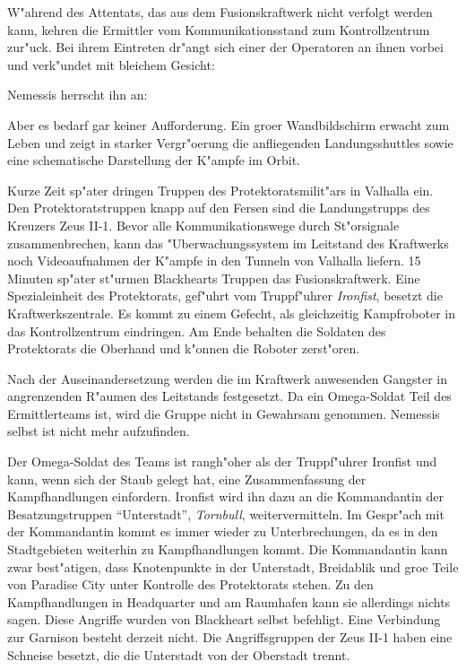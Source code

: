 
W"ahrend des Attentats, das aus dem Fusionskraftwerk nicht verfolgt werden kann, kehren die Ermittler vom Kommunikationsstand zum Kontrollzentrum zur"uck. Bei ihrem Eintreten dr"angt sich einer der Operatoren an ihnen vorbei und verk"undet mit bleichem Gesicht:

 Nemessis herrscht ihn an: 

Aber es bedarf gar keiner Aufforderung. Ein gro\3er Wandbildschirm erwacht zum Leben und zeigt in starker Vergr"o\3erung die anfliegenden Landungsshuttles sowie eine schematische Darstellung der K"ampfe im Orbit.

Kurze Zeit sp"ater dringen Truppen des Protektoratsmilit"ars in Valhalla ein. Den Protektoratstruppen knapp auf den Fersen sind die Landungstrupps des Kreuzers Zeus II-1. Bevor alle Kommunikationswege durch St"orsignale zusammenbrechen, kann das "Uberwachungssystem im Leitstand des Kraftwerks noch Videoaufnahmen der K"ampfe in den Tunneln von Valhalla liefern. 15 Minuten sp"ater st"urmen Blackhearts Truppen das Fusionskraftwerk. Eine Spezialeinheit des Protektorats, gef"uhrt vom Truppf"uhrer \emph{Ironfist}, besetzt die Kraftwerkszentrale. Es kommt zu einem Gefecht, als gleichzeitig Kampfroboter in das Kontrollzentrum eindringen. Am Ende behalten die Soldaten des Protektorats die Oberhand und k"onnen die Roboter zerst"oren.

Nach der Auseinandersetzung werden die im Kraftwerk anwesenden Gangster in angrenzenden R"aumen des Leitstands festgesetzt. Da ein Omega-Soldat Teil des Ermittlerteams ist, wird die Gruppe nicht in Gewahrsam genommen. Nemessis selbst ist nicht mehr aufzufinden.

Der Omega-Soldat des Teams ist rangh"oher als der Truppf"uhrer Ironfist und kann, wenn sich der Staub gelegt hat, eine Zusammenfassung der Kampfhandlungen einfordern. Ironfist wird ihn dazu an die Kommandantin der Besatzungstruppen ``Unterstadt'', \emph{Tornbull}, weitervermitteln. Im Gespr"ach mit der Kommandantin kommt es immer wieder zu Unterbrechungen, da es in den Stadtgebieten weiterhin zu Kampfhandlungen kommt. Die Kommandantin kann zwar best"atigen, dass Knotenpunkte in der Unterstadt, Breidablik und gro\3e Teile von Paradise City unter Kontrolle des Protektorats stehen. Zu den Kampfhandlungen in Headquarter und am Raumhafen kann sie allerdings nichts sagen. Diese Angriffe wurden von Blackheart selbst befehligt. Eine Verbindung zur Garnison besteht derzeit nicht. Die Angriffsgruppen der Zeus II-1 haben eine Schneise besetzt, die die Unterstadt von der Oberstadt trennt.

